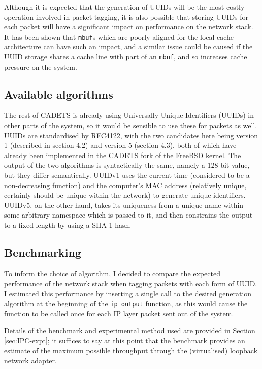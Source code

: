 \documentclass[a4paper,12pt,twoside,openright]{report}
\begin{document}
	Although it is expected that the generation of UUIDs will be the most costly operation involved in packet tagging, it is also possible that storing UUIDs for each packet will have a significant impact on performance on the network stack. It has been shown that \verb|mbuf|s which are poorly aligned for the local cache architecture can have such an impact\cite{mbuf-cache-netflix}, and a similar issue could be caused if the UUID storage shares a cache line with part of an \verb|mbuf|, and so increases cache pressure on the system.
	
	\subsection{Available algorithms}
	
	The rest of CADETS is already using Universally Unique Identifiers (UUIDs) in other parts of the system, so it would be sensible to use these for packets as well. UUIDs are standardised by RFC4122\cite{RFC4122}, with the two candidates here being version 1 (described in section 4.2) and version 5 (section 4.3), both of which have already been implemented in the CADETS fork of the FreeBSD kernel. The output of the two algorithms is syntactically the same, namely a 128-bit value, but they differ semantically. UUIDv1 uses the current time (considered to be a non-decreasing function) and the computer's MAC address (relatively unique, certainly should be unique within the network) to generate unique identifiers. UUIDv5, on the other hand, takes its uniqueness from a unique name within some arbitrary namespace which is passed to it, and then constrains the output to a fixed length by using a SHA-1 hash.
	
	\subsection{Benchmarking}
	
	To inform the choice of algorithm, I decided to compare the expected performance of the network stack when tagging packets with each form of UUID. I estimated this performance by inserting a single call to the desired generation algorithm at the beginning of the \verb|ip_output| function, as this would cause the function to be called once for each IP layer packet sent out of the system.
	
	Details of the benchmark and experimental method used are provided in Section \ref{sec:IPC-expt}; it suffices to say at this point that the benchmark provides an estimate of the maximum possible throughput through the (virtualised) loopback network adapter.
	
\end{document}

